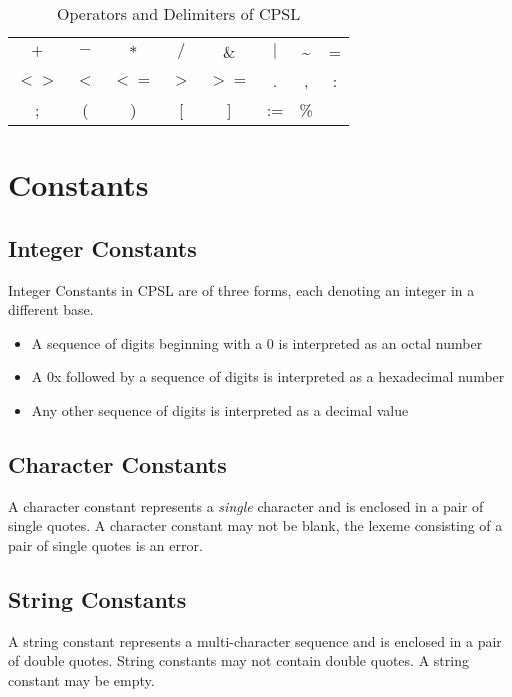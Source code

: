 \documentclass{book}
\begin{document}
\begin{table}[h!]
\begin{center}
\begin{tabular}{cccccccc}
$+$ & $-$ & $*$ & $/$ & \& & $|$ & \textasciitilde & = \\
$<>$ & $<$ & $<=$ & $>$ & $>=$ & . & , & : \\
; & ( & ) & [ & ] & := & \% &  \\

\end{tabular}
\end{center}
\caption{Operators and Delimiters of CPSL}
\end{table}
\section{Constants}
\subsection{Integer Constants}
Integer Constants in CPSL are of three forms, each denoting an integer in a different base.
\begin{itemize}
\item A sequence of digits beginning with a 0 is interpreted as an octal number
\item A 0x followed by a sequence of digits is interpreted as a hexadecimal number
\item Any other sequence of digits is interpreted as a decimal value
\end{itemize}
\subsection{Character Constants}
A character constant represents a \textit{single} character and is enclosed in a pair of single quotes.  A character constant may not be blank, the lexeme consisting of a pair of single quotes is an error.
\subsection{String Constants}
A string constant represents a multi-character sequence and is enclosed in a pair of double quotes. String constants may not contain double quotes.
A string constant may be empty.
\end{document}
